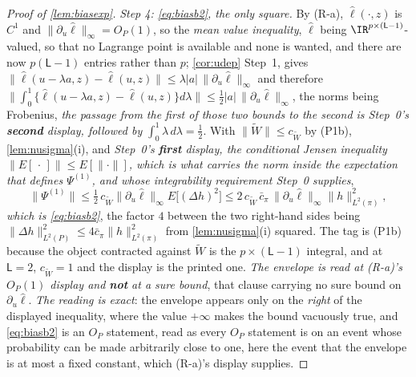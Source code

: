 \begin{proof}[Proof of \cref{lem:biasexp}]
\emph{Step 4: \eqref{eq:biasb2}, the only square.} By (R-a), $\hat\ell(\cdot,z)$ is $C^{1}$ and
$\|\partial_u\hat\ell\|_\infty=O_P(1)$, so the \emph{mean value inequality}, $\hat\ell$ being
$\IR^{p\times(\mathsf L-1)}$-valued, so that no Lagrange point is available and none is wanted, and there
are now $p(\mathsf L-1)$ entries rather than $p$; \cref{cor:udep} Step~1, 
gives
$\|\hat\ell(u-\lambda a,z)-\hat\ell(u,z)\|\le\lambda|a|\,\|\partial_u\hat\ell\|_\infty$ and therefore
$\|\int_0^1\{\hat\ell(u-\lambda a,z)-\hat\ell(u,z)\}d\lambda\|\le\tfrac12|a|\,\|\partial_u\hat\ell\|_\infty$,
the norms being Frobenius, \emph{the passage from the first of those two bounds to the second is
Step~0's \textbf{second} display, followed by $\int_0^1\lambda\,d\lambda=\tfrac12$}. With
$\|\widetilde W\|\le c_{\widetilde W}$ by \textup{(P1b)}, \cref{lem:nusigma}(i), and
\emph{Step~0's \textbf{first} display, the conditional Jensen
inequality $\|E[\,\cdot\,]\|\le E[\|\cdot\|]$, which is what carries the norm inside the expectation that
defines $\Psi^{(1)}$, and whose integrability requirement Step~0 supplies},
\[
\big\|\Psi^{(1)}\big\|\le\tfrac12\,c_{\widetilde W}\big\|\partial_u\hat\ell\big\|_\infty E\big[(\Delta h)^{2}\big]
\le2\,c_{\widetilde W}\,\bar c_\pi\,\big\|\partial_u\hat\ell\big\|_\infty\big\|h\big\|^{2}_{L^{2}(\pi)} ,
\]
\emph{which is \eqref{eq:biasb2}}, the factor $4$ between the two right-hand sides being
$\|\Delta h\|^{2}_{L^{2}(P)}\le4\bar c_\pi\|h\|^{2}_{L^{2}(\pi)}$ from \cref{lem:nusigma}(i) squared.
The tag is \textup{(P1b)} because the object contracted against $\widetilde W$ is the
$p\times(\mathsf L-1)$ integral, and at $\mathsf L=2$, $c_{\widetilde W}=1$ and the display is the printed
one.
\emph{The envelope is read at (R-a)'s $O_P(1)$ display and \textbf{not} at a sure bound}, that clause
carrying no sure bound on $\partial_u\hat\ell$. \emph{The reading is exact}: the envelope appears only on the
\emph{right} of the displayed inequality, where the value $+\infty$ makes the bound vacuously true, and
\eqref{eq:biasb2} is an $O_P$ statement, read as every $O_P$ statement is on an event whose probability can
be made arbitrarily close to one, here the event that the envelope is at most a fixed constant, which
(R-a)'s display supplies.


\end{proof}
